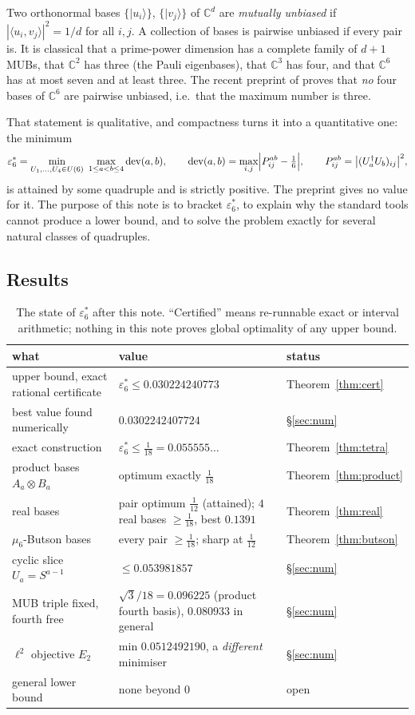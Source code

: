 \documentclass[11pt,a4paper]{article}
\theoremstyle{remark}
\newcommand{\C}{\mathbb{C}}
\newcommand{\dev}{\operatorname{dev}}
\newcommand{\eps}{\varepsilon}
\begin{document}
Two orthonormal bases $\{|u_i\rangle\}$, $\{|v_j\rangle\}$ of $\C^d$ are \emph{mutually
unbiased} if $|\langle u_i,v_j\rangle|^2=1/d$ for all $i,j$.  A collection of bases is
pairwise unbiased if every pair is.  It is classical that a prime-power dimension has a
complete family of $d+1$ MUBs, that $\C^2$ has three (the Pauli eigenbases), that $\C^3$ has
four, and that $\C^6$ has at most seven and at least three.  The recent preprint of
\cite{preprint} proves that \emph{no} four bases of $\C^6$ are pairwise unbiased, i.e.\ that
the maximum number is three.

That statement is qualitative, and compactness turns it into a quantitative one: the minimum
\[
\eps_6^*=\min_{U_1,\dots,U_4\in U(6)}\ \max_{1\le a<b\le4}\dev(a,b),
\qquad
\dev(a,b)=\max_{i,j}\Bigl|P^{ab}_{ij}-\tfrac16\Bigr|,
\qquad
P^{ab}_{ij}=\bigl|(U_a^\dagger U_b)_{ij}\bigr|^2 ,
\]
is attained by some quadruple and is strictly positive.  The preprint gives no value for it.
The purpose of this note is to bracket $\eps_6^*$, to explain why the standard tools cannot
produce a lower bound, and to solve the problem exactly for several natural classes of
quadruples.

\subsection{Results}

\begin{table}[h]
\centering
\small
\begin{tabular}{@{}lll@{}}
\toprule
what & value & status\\
\midrule
upper bound, exact rational certificate & $\eps_6^*\le 0.030224240773$ & Theorem~\ref{thm:cert}\\
best value found numerically & $0.0302242407724$ & \S\ref{sec:num}\\
exact construction & $\eps_6^*\le \tfrac1{18}=0.055555\ldots$ & Theorem~\ref{thm:tetra}\\
product bases $A_a\otimes B_a$ & optimum exactly $\tfrac1{18}$ & Theorem~\ref{thm:product}\\
real bases & pair optimum $\tfrac1{12}$ (attained); $4$ real bases $\ge\tfrac1{18}$, best $0.1391$ & Theorem~\ref{thm:real}\\
$\mu_6$-Butson bases & every pair $\ge\tfrac1{18}$; sharp at $\tfrac1{12}$ & Theorem~\ref{thm:butson}\\
cyclic slice $U_a=S^{a-1}$ & $\le 0.053981857$ & \S\ref{sec:num}\\
MUB triple fixed, fourth free & $\sqrt3/18=0.096225$ (product fourth basis), $0.080933$ in general & \S\ref{sec:num}\\
$\ell^2$ objective $E_2$ & min $0.0512492190$, a \emph{different} minimiser & \S\ref{sec:num}\\
general lower bound & none beyond $0$ & open\\
\bottomrule
\end{tabular}
\caption{The state of $\eps_6^*$ after this note.  ``Certified'' means re-runnable exact or
interval arithmetic; nothing in this note proves global optimality of any upper bound.}
\end{table}
\end{document}
